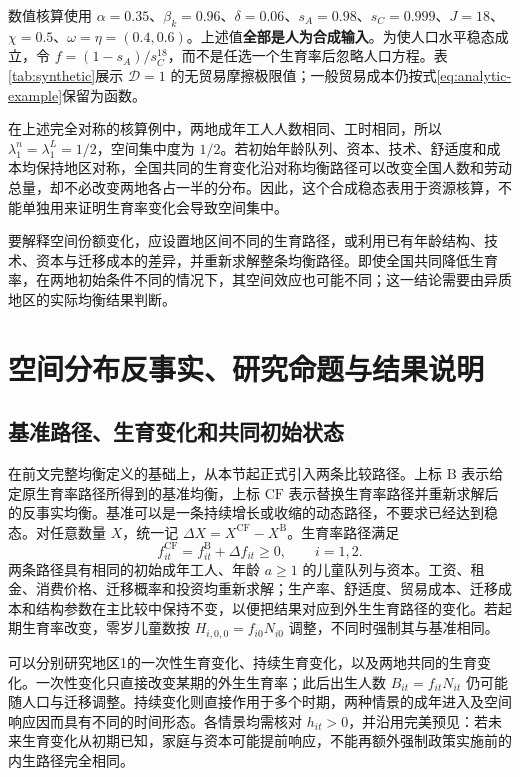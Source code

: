 \documentclass[UTF8,a4paper,zihao=-4,fontset=windows]{ctexart}
\numberwithin{equation}{section}
\begin{document}
数值核算使用 $\alpha=0.35$、$\beta_k=0.96$、$\delta=0.06$、$s_A=0.98$、$s_C=0.999$、$J=18$、$\chi=0.5$、$\omega=\eta=(0.4,0.6)$。上述值\textbf{全部是人为合成输入}。为使人口水平稳态成立，令 $f=(1-s_A)/s_C^{18}$，而不是任选一个生育率后忽略人口方程。表\ref{tab:synthetic}展示 $\mathcal D=1$ 的无贸易摩擦极限值；一般贸易成本仍按式\eqref{eq:analytic-example}保留为函数。



在上述完全对称的核算例中，两地成年工人人数相同、工时相同，所以 $\lambda^n_1=\lambda^L_1=1/2$，空间集中度为 $1/2$。若初始年龄队列、资本、技术、舒适度和成本均保持地区对称，全国共同的生育变化沿对称均衡路径可以改变全国人数和劳动总量，却不必改变两地各占一半的分布。因此，这个合成稳态表用于资源核算，不能单独用来证明生育率变化会导致空间集中。

要解释空间份额变化，应设置地区间不同的生育路径，或利用已有年龄结构、技术、资本与迁移成本的差异，并重新求解整条均衡路径。即使全国共同降低生育率，在两地初始条件不同的情况下，其空间效应也可能不同；这一结论需要由异质地区的实际均衡结果判断。

\section{空间分布反事实、研究命题与结果说明}
\label{sec:spatial-counterfactual}

\subsection{基准路径、生育变化和共同初始状态}
在前文完整均衡定义的基础上，从本节起正式引入两条比较路径。上标 $\mathrm B$ 表示给定原生育率路径所得到的基准均衡，上标 $\mathrm{CF}$ 表示替换生育率路径并重新求解后的反事实均衡。基准可以是一条持续增长或收缩的动态路径，不要求已经达到稳态。对任意数量 $X$，统一记 $\Delta X=X^{\mathrm{CF}}-X^{\mathrm B}$。生育率路径满足
\begin{equation}
 f^{\mathrm{CF}}_{it}=f^{\mathrm B}_{it}+\Delta f_{it}\geq0,\qquad i=1,2.
 \label{eq:two-region-fertility-counterfactual}
\end{equation}
两条路径具有相同的初始成年工人、年龄 $a\geq1$ 的儿童队列与资本。工资、租金、消费价格、迁移概率和投资均重新求解；生产率、舒适度、贸易成本、迁移成本和结构参数在主比较中保持不变，以便把结果对应到外生生育路径的变化。若起期生育率改变，零岁儿童数按 $H_{i,0,0}=f_{i0}N_{i0}$ 调整，不同时强制其与基准相同。

可以分别研究地区1的一次性生育变化、持续生育变化，以及两地共同的生育变化。一次性变化只直接改变某期的外生生育率；此后出生人数 $B_{it}=f_{it}N_{it}$ 仍可能随人口与迁移调整。持续变化则直接作用于多个时期，两种情景的成年进入及空间响应因而具有不同的时间形态。各情景均需核对 $h_{it}>0$，并沿用完美预见：若未来生育变化从初期已知，家庭与资本可能提前响应，不能再额外强制政策实施前的内生路径完全相同。
\end{document}
